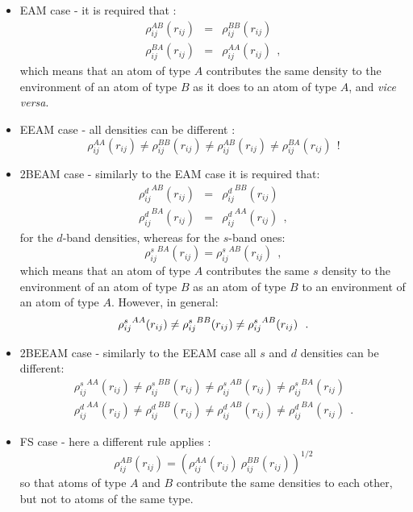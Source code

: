 \begin{itemize}
\item EAM case - it is required that \cite{johnson-89a}:
\begin{eqnarray}
\rho^{AB}_{ij}(r_{ij})&=&\rho^{BB}_{ij}(r_{ij}) \nonumber \\
\rho^{BA}_{ij}(r_{ij})&=&\rho^{AA}_{ij}(r_{ij})~~,
\end{eqnarray}
which means that an atom of type $A$ contributes the same density to
the environment of an atom of type $B$ as it does to an atom of type
$A$, and {\em vice versa}.
\item EEAM case - all densities can be different \cite{hepburn-08a,lau-07a}:
\begin{equation}
\rho^{AA}_{ij}(r_{ij}) \neq \rho^{BB}_{ij}(r_{ij}) \neq \rho^{AB}_{ij}(r_{ij}) \neq
\rho^{BA}_{ij}(r_{ij})~~!
\end{equation}
\item 2BEAM case - similarly to the EAM case it is required that:
\begin{eqnarray}
{\rho^{d}_{ij}}^{AB}(r_{ij})&=&{\rho^{d}_{ij}}^{BB}(r_{ij}) \nonumber \\
{\rho^{d}_{ij}}^{BA}(r_{ij})&=&{\rho^{d}_{ij}}^{AA}(r_{ij})~~,
\end{eqnarray}
for the $d$-band densities, whereas for the $s$-band ones:
\begin{equation}
{\rho^{s}_{ij}}^{BA}(r_{ij}) = {\rho^{s}_{ij}}^{AB}(r_{ij})~~,
\end{equation}
which means that an atom of type $A$ contributes the same $s$ density to
the environment of an atom of type $B$ as an atom of type $B$ to an
environment of an atom of type $A$.  However, in general:
\begin{equation}
{\rho^{s}_{ij}}^{AA}(r_{ij}) \neq {\rho^{s}_{ij}}^{BB}(r_{ij}) \neq {\rho^{s}_{ij}}^{AB}(r_{ij})~~. \\
\end{equation}
\item 2BEEAM case - similarly to the EEAM case all $s$ and $d$
densities can be different:
\begin{eqnarray}
{\rho^{s}_{ij}}^{AA}(r_{ij}) \neq {\rho^{s}_{ij}}^{BB}(r_{ij}) \neq
{\rho^{s}_{ij}}^{AB}(r_{ij}) \neq {\rho^{s}_{ij}}^{BA}(r_{ij}) \nonumber \\
{\rho^{d}_{ij}}^{AA}(r_{ij}) \neq {\rho^{d}_{ij}}^{BB}(r_{ij}) \neq
{\rho^{d}_{ij}}^{AB}(r_{ij}) \neq {\rho^{d}_{ij}}^{BA}(r_{ij}) ~~.
\end{eqnarray}
\item FS case - here a different rule applies \cite{sutton-91a}:
\begin{equation}
\rho^{AB}_{ij}(r_{ij})=(\rho^{AA}_{ij}(r_{ij})~\rho^{BB}_{ij}(r_{ij}))^{1/2}
\end{equation}
so that atoms of type $A$ and $B$ contribute the same densities to
each other, but not to atoms of the same type.
\end{itemize}

